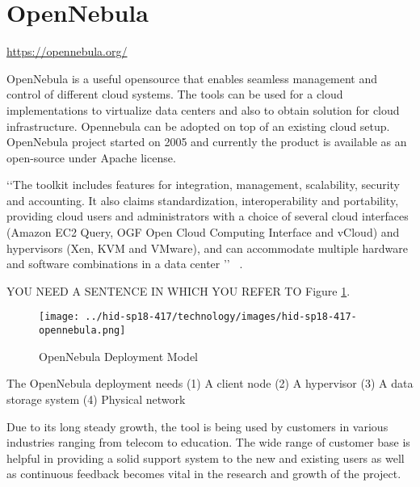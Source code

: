 
\section{OpenNebula}
\url{https://opennebula.org/} 
   
OpenNebula is a useful opensource that enables seamless management and control of different cloud systems.
The tools can be used for a cloud implementations 
to virtualize data centers and also to obtain solution for cloud infrastructure.
Opennebula can be adopted on top of an existing cloud setup.
OpenNebula project started on 2005 and currently the product is available as an open-source under Apache license. 

‘‘The toolkit includes features for integration, management, scalability, security and accounting.
It also claims standardization, interoperability and portability, providing cloud users and administrators with a choice of several
cloud interfaces (Amazon EC2 Query, OGF Open Cloud Computing Interface and vCloud) and hypervisors
(Xen, KVM and VMware), and can accommodate multiple hardware and software combinations in a data center ’’
~\cite{hid-sp18-417-opennebula-wiki}.

YOU NEED A SENTENCE IN WHICH YOU REFER TO Figure \ref{F:opennebula}.

\begin{figure}[htb]
\texttt{[image: ../hid-sp18-417/technology/images/hid-sp18-417-opennebula.png]}
\caption{OpenNebula Deployment Model ~\cite{hid-sp18-417-opennebula-deployment}} 
\label{F:opennebula}
\end{figure}

The OpenNebula deployment needs (1) A client node (2) A hypervisor (3) A data storage system (4) Physical network

Due to its long steady growth, the tool is being used by customers in various industries ranging from telecom to education.
The wide range of customer base is helpful in providing a solid support system to the new and existing users as well as continuous feedback becomes vital in the research and growth of the project. 

